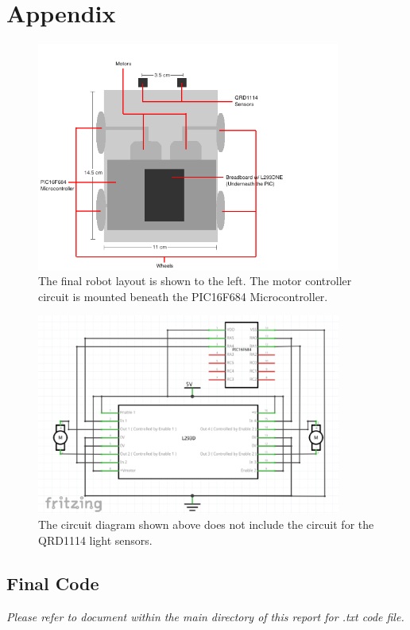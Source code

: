\documentclass[12pt]{article}
\begin{document}
\section{Appendix}
	\begin{figure}
		\includegraphics[width=10cm]{LayoutDiagram}
		\caption{The final robot layout is shown to the left. The motor controller circuit is mounted beneath the PIC16F684 Microcontroller.}
	\end{figure}
	\begin{figure}
	\includegraphics[width=10cm]{CircuitDiagram}
	\caption{The circuit diagram shown above does not include the circuit for the QRD1114 light sensors.}
	\end{figure}
\subsection{Final Code}
\textit{Please refer to document within the main directory of this report for .txt code file.}
\end{document}

